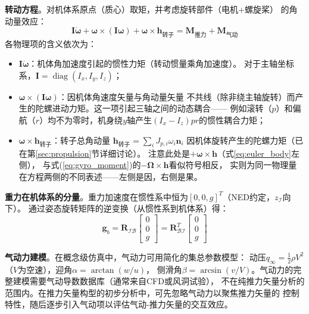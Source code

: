 \textbf{转动方程}。对机体系原点（质心）取矩，并考虑旋转部件（电机+螺旋桨）
的角动量效应：
\begin{equation}
    \bm{I} \dot{\bm{\omega}} + \bm{\omega} \times (\bm{I} \bm{\omega})
    + \bm{\omega} \times \bm{h}_{\text{转子}}
    = \bm{M}_{\text{推力}} + \bm{M}_{\text{气动}}
    \label{eq:euler_body}
\end{equation}
各物理项的含义依次为：
\begin{itemize}
    \item $\bm{I} \dot{\bm{\omega}}$：机体角加速度引起的惯性力矩（转动惯量乘角加速度）。
          对于主轴坐标系，$\bm{I} = \operatorname{diag}(I_x, I_y, I_z)$；
    \item $\bm{\omega} \times (\bm{I} \bm{\omega})$：因机体角速度矢量与角动量矢量
          不共线（除非绕主轴旋转）而产生的陀螺进动力矩。这一项引起三轴之间的动态耦合——
          例如滚转（$p$）和偏航（$r$）均不为零时，机身绕$y$轴产生$(I_x-I_z)pr$的惯性耦合力矩；
    \item $\bm{\omega} \times \bm{h}_{\text{转子}}$：转子总角动量
          $\bm{h}_{\text{转子}} = \sum_i J_{p,i} \omega_i \bm{n}_i$
          因机体旋转产生的陀螺力矩（已在第\ref{sec:propulsion}节详细讨论）。
          注意此处是$+\bm{\omega} \times \bm{h}$（式\ref{eq:euler_body}左侧），
          与式(\ref{eq:gyro_moment})的$-\bm{\Omega} \times \bm{h}$看似符号相反，
          实则为同一物理量在方程两侧的不同表述——左侧是因，右侧是果。
\end{itemize}

\textbf{重力在机体系的分量}。重力加速度在惯性系中恒为$[0, 0, g]^T$（NED约定，$z_{\mathcal{I}}$向下）。
通过姿态旋转矩阵的逆变换（从惯性系到机体系）得：
\begin{equation}
    \bm{g}_b = \bm{R}_{\mathcal{I}\mathcal{B}}
    \begin{bmatrix} 0 \\ 0 \\ g \end{bmatrix}
    = \bm{R}_{\mathcal{B}\mathcal{I}}^T
    \begin{bmatrix} 0 \\ 0 \\ g \end{bmatrix}
    \label{eq:gravity_body}
\end{equation}

\textbf{气动力建模}。在概念级仿真中，气动力可用简化的集总参数模型\cite{beard2012small}：
动压$q_\infty = \frac{1}{2}\rho V^2$（$V$为空速），迎角$\alpha = \arctan(w/u)$，
侧滑角$\beta = \arcsin(v/V)$。气动力的完整建模需要气动导数数据库（通常来自CFD或风洞试验），
不在纯推力矢量分析的范围内。在推力矢量构型的初步分析中，可先忽略气动力以聚焦推力矢量的
控制特性，随后逐步引入气动项以评估气动-推力矢量的交互效应。

